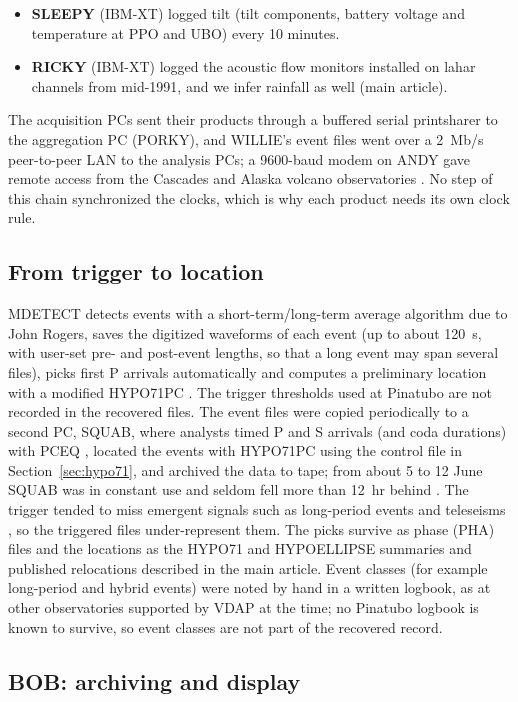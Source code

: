 \documentclass[11pt]{article}
\begin{document}
\begin{itemize}
\item \textbf{SLEEPY} (IBM-XT) logged tilt (tilt components, battery voltage and temperature at PPO and UBO) every 10 minutes.
\item \textbf{RICKY} (IBM-XT) logged the acoustic flow monitors installed on lahar channels from mid-1991, and we infer rainfall as well (main article).
\end{itemize}
The acquisition PCs sent their products through a buffered serial printsharer to the aggregation PC (PORKY), and WILLIE's event files went over a 2~Mb/s peer-to-peer LAN to the analysis PCs; a 9600-baud modem on ANDY gave remote access from the Cascades and Alaska volcano observatories \citep{Murray_1996}. No step of this chain synchronized the clocks, which is why each product needs its own clock rule.

\subsection{From trigger to location}

MDETECT detects events with a short-term/long-term average algorithm due to John Rogers, saves the digitized waveforms of each event (up to about 120~s, with user-set pre- and post-event lengths, so that a long event may span several files), picks first P arrivals automatically and computes a preliminary location with a modified HYPO71PC \citep{Lee_1988}. The trigger thresholds used at Pinatubo are not recorded in the recovered files. The event files were copied periodically to a second PC, SQUAB, where analysts timed P and S arrivals (and coda durations) with PCEQ \citep{Valdes_1989}, located the events with HYPO71PC \citep{Lee_1985} using the control file in Section~\ref{sec:hypo71}, and archived the data to tape; from about 5 to 12 June SQUAB was in constant use and seldom fell more than 12~hr behind \citep{Murray_1996}. The trigger tended to miss emergent signals such as long-period events and teleseisms \citep{Lockhart_1996}, so the triggered files under-represent them. The picks survive as phase (PHA) files and the locations as the HYPO71 and HYPOELLIPSE summaries and published relocations described in the main article. Event classes (for example long-period and hybrid events) were noted by hand in a written logbook, as at other observatories supported by VDAP at the time; no Pinatubo logbook is known to survive, so event classes are not part of the recovered record.

\subsection{BOB: archiving and display}
\end{document}
